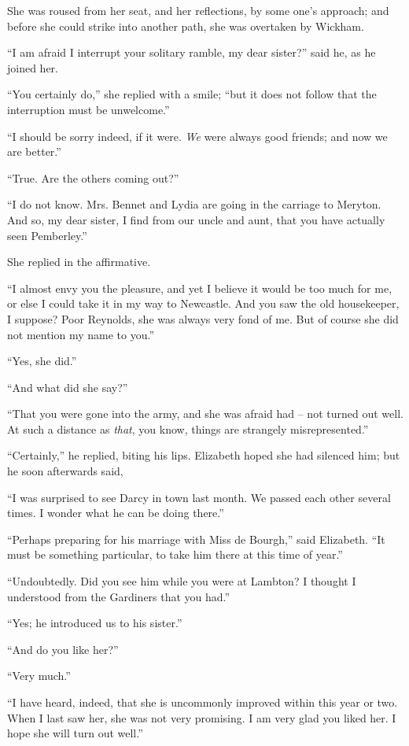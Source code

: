 She was roused from her seat, and her reflections, by
some one’s approach; and before she could strike into
another path, she was overtaken by Wickham.

“I am afraid I interrupt your solitary ramble, my dear
sister?” said he, as he joined her.

“You certainly do,” she replied with a smile; “but
it does not follow that the interruption must be
unwelcome.”

“I should be sorry indeed, if it were. \textit{We} were always
good friends; and now we are better.”

“True. Are the others coming out?”

“I do not know. Mrs. Bennet and Lydia are going in
the carriage to Meryton. And so, my dear sister, I find
from our uncle and aunt, that you have actually seen
Pemberley.”

She replied in the affirmative.

“I almost envy you the pleasure, and yet I believe
it would be too much for me, or else I could take it in my
way to Newcastle. And you saw the old housekeeper,
I suppose? Poor Reynolds, she was always very fond of
me. But of course she did not mention my name to you.”

“Yes, she did.”

“And what did she say?”

“That you were gone into the army, and she was
afraid had -- not turned out well. At such a distance as
\textit{that}, you know, things are strangely misrepresented.”

“Certainly,” he replied, biting his lips. Elizabeth
hoped she had silenced him; but he soon afterwards
said,

“I was surprised to see Darcy in town last month. We
passed each other several times. I wonder what he can
be doing there.”

“Perhaps preparing for his marriage with Miss de
Bourgh,” said Elizabeth. “It must be something particular,
to take him there at this time of year.”

“Undoubtedly. Did you see him while you were at
Lamb\-ton? I thought I understood from the Gardiners
that you had.”

“Yes; he introduced us to his sister.”

“And do you like her?”

“Very much.”

“I have heard, indeed, that she is uncommonly improved
within this year or two. When I last saw her, she
was not very promising. I am very glad you liked her.
I hope she will turn out well.”


